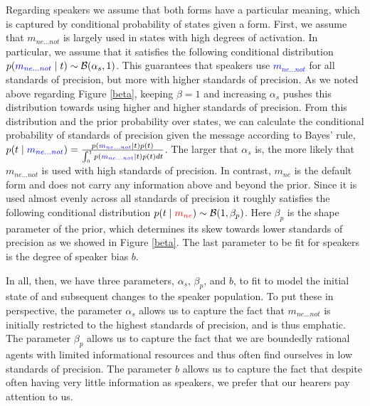 \documentclass[linguex]{sp}
\theoremstyle{definition} \newtheorem{definition}{Definition}
\begin{document}
Regarding speakers we assume that both forms have a particular meaning, which is captured by conditional probability of states given a form. First, we assume that \textit{\color{blue} $m_{ne...not}$} is largely used in states with high degrees of activation. In particular, we assume that it satisfies the following conditional distribution $p(\textcolor{blue}{m_{ne...not}} \mid t ) \sim \mathcal{B}(\alpha_{s}, 1)$.  This guarantees that speakers use \textcolor{blue}{$m_{ne...not}$} for all standards of precision, but more with higher standards of precision. As we noted above regarding Figure \ref{beta}, keeping $\beta=1$ and increasing $\alpha_s$ pushes this distribution towards using higher and higher standards of precision. From this distribution and the prior probability over states, we can calculate the conditional probability of standards of precision given the message according to Bayes' rule, $p(t \mid \textcolor{blue}{m_{ne...not}}) = \frac{p(\textcolor{blue}{m_{ne...not}} \mid t ) p(t)}{\int_0^1 p(\textcolor{blue}{m_{ne...not}} \mid t ) p(t)dt}$. The larger that $\alpha_{s}$ is, the more likely that \textit{\color{blue} $m_{ne...not}$} is used with high standards of precision.  In contrast, \textit{\color{red} $m_{ne}$} is the default form and does not carry any information above and beyond the prior. Since it is used almost evenly across all standards of precision it roughly satisfies the following conditional distribution $p(t \mid \textit{\color{red} $m_{ne}$}) \sim \mathcal B (1, \beta_p)$. Here $\beta_p$ is the shape parameter of the prior, which determines its skew towards lower standards of precision as we showed in Figure \ref{beta}. The last parameter to be fit for speakers is the degree of speaker bias $b$.

In all, then, we have three parameters, $\alpha_{s}$, $\beta_p$, and $b$, to fit to model the initial state of and subsequent changes to the speaker population. To put these in perspective, the parameter $\alpha_{s}$ allows us to capture the fact that \textit{\color{blue} $m_{ne...not}$} is initially restricted to the highest standards of precision, and is thus emphatic. The parameter $\beta_p$ allows us to capture the fact that we are boundedly rational agents with limited informational resources and thus often find ourselves in low standards of precision. The parameter $b$ allows us to capture the fact that despite often having very little information as speakers, we prefer that our hearers pay attention to us.
\end{document}
